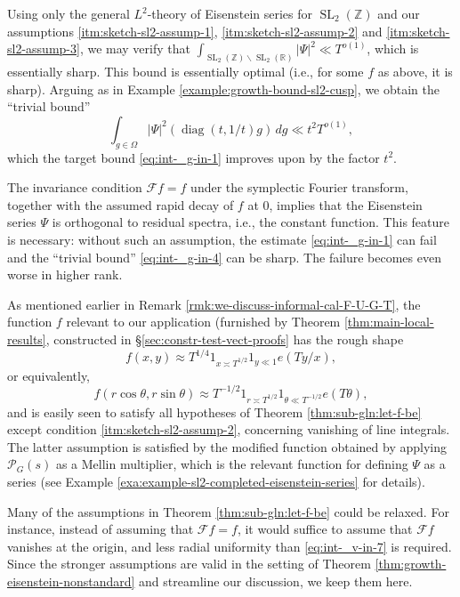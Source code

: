 \documentclass[reqno]{amsart}
\DeclareMathOperator{\SL}{SL}
\DeclareMathOperator{\diag}{diag}
\theoremstyle{plain} \newtheorem{theorem} {Theorem}
\theoremstyle{definition} \newtheorem{definition} [theorem] {Definition}
\theoremstyle{itplain} %
\numberwithin{equation}{section}
\numberwithin{theorem}{section}
\begin{document}
\begin{remark}
  Using only the general $L^2$-theory of Eisenstein series for $\SL_2(\mathbb{Z})$ and our assumptions \eqref{itm:sketch-sl2-assump-1}, \eqref{itm:sketch-sl2-assump-2} and \eqref{itm:sketch-sl2-assump-3}, we may verify that $\int _{\SL_2(\mathbb{Z}) \backslash \SL_2(\mathbb{R}) } |\Psi|^2 \ll T^{o(1)}$, which is essentially sharp.  This bound is essentially optimal (i.e., for some $f$ as above, it is sharp).  Arguing as in Example \ref{example:growth-bound-sl2-cusp}, we obtain the ``trivial bound''
  \begin{equation}\label{eq:int-_g-in-4}
    \int _{g \in \Omega } |\Psi|^2 (\diag(t, 1/t) g) \, d g
    \ll
    t^2 T^{o(1)},
  \end{equation}
  which the target bound \eqref{eq:int-_g-in-1} improves upon by the factor $t^2$.
\end{remark}
\begin{remark}
  The invariance condition $\mathcal{F} f = f$ under the symplectic Fourier transform, together with the assumed rapid decay of $f$ at $0$, implies that the Eisenstein series $\Psi$ is orthogonal to residual spectra, i.e., the constant function.  This feature is necessary: without such an assumption, the estimate \eqref{eq:int-_g-in-1} can fail and the ``trivial bound'' \eqref{eq:int-_g-in-4} can be sharp.  The failure becomes even worse in higher rank.
\end{remark}
\begin{remark}
  As mentioned earlier in Remark \ref{rmk:we-discuss-informal-cal-F-U-G-T}, the function $f$ relevant to our application (furnished by Theorem \ref{thm:main-local-results}, constructed in \S\ref{sec:constr-test-vect-proofs} has the rough shape
  \begin{equation*}
    f(x,y) \approx T^{1/4} 1_{x \asymp T^{1/2}} 1_{y \ll 1} e(T y / x),
  \end{equation*}
  or equivalently,
  \begin{equation*}
        f(r \cos \theta, r \sin \theta) \approx
    T^{-1/2} 1_{r \asymp T^{1/2}}
    1 _{\theta \ll T^{-1/2}} e(T \theta),
  \end{equation*}
  and is easily seen to satisfy all hypotheses of Theorem \ref{thm:sub-gln:let-f-be} except condition \eqref{itm:sketch-sl2-assump-2}, concerning vanishing of line integrals.  The latter assumption is satisfied by the modified function obtained by applying $\mathcal{P}_G(s)$ as a Mellin multiplier, which is the relevant function for defining $\Psi$ as a series (see Example \ref{exa:example-sl2-completed-eisenstein-series} for details).
\end{remark}
\begin{remark}
  Many of the assumptions in Theorem \ref{thm:sub-gln:let-f-be} could be relaxed.  For instance, instead of assuming that $\mathcal{F} f = f$, it would suffice to assume that $\mathcal{F} f$ vanishes at the origin, and less radial uniformity than \eqref{eq:int-_v-in-7} is required.  Since the stronger assumptions are valid in the setting of Theorem \ref{thm:growth-eisenstein-nonstandard} and streamline our discussion, we keep them here.
\end{remark}
\end{document}

